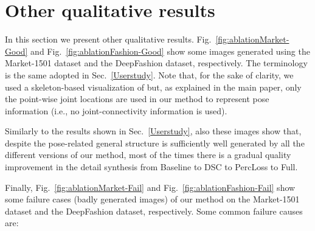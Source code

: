 \documentclass[10pt,twocolumn,letterpaper]{article}
\begin{document}
\section{Other qualitative results}
\label{Other}

In this section we present  other qualitative results. Fig.~\ref{fig:ablationMarket-Good} and 
Fig.~\ref{fig:ablationFashion-Good}
show some images generated using the Market-1501 dataset and the DeepFashion dataset, respectively. The terminology is the same adopted in Sec.~\ref{Userstudy}. Note that, for the sake of clarity, we used a skeleton-based visualization of  but, as explained in the main paper, only the point-wise joint locations are used in our method to represent pose information (i.e., no joint-connectivity information is used).

Similarly to the results shown in Sec.~\ref{Userstudy}, also these images show that, 
despite the pose-related general structure is sufficiently well generated by all the different versions of our method,
most of the times there is a gradual quality improvement in the detail synthesis from Baseline to DSC to PercLoss to Full.

Finally,  Fig.~\ref{fig:ablationMarket-Fail} and 
Fig.~\ref{fig:ablationFashion-Fail} show some failure cases (badly generated images) of our method on the Market-1501 dataset and the DeepFashion dataset, respectively.
Some common failure  causes are:
\end{document}
